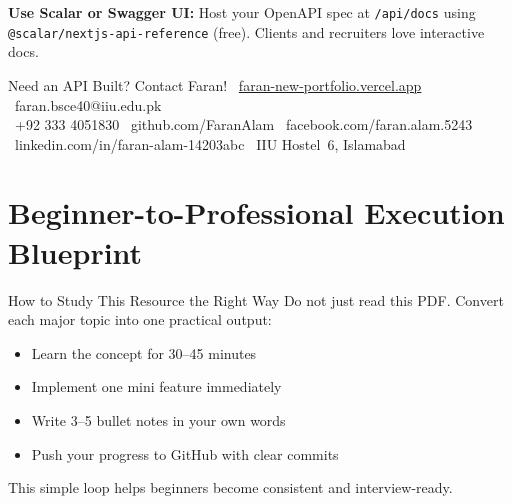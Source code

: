 \documentclass[12pt,a4paper]{article}
\begin{document}
\begin{tipbox}
\textbf{Use Scalar or Swagger UI:} Host your OpenAPI spec at \texttt{/api/docs} using \texttt{@scalar/nextjs-api-reference} (free). Clients and recruiters love interactive docs.
\end{tipbox}

\vspace{0.5cm}
\begin{infobox}{Need an API Built? Contact Faran!}
\faGlobe\ \href{https://faran-new-portfolio.vercel.app/}{faran-new-portfolio.vercel.app} \quad \faEnvelope\ faran.bsce40@iiu.edu.pk\\[0.1cm]
\faWhatsapp\ +92 333 4051830 \quad \faGithub\ github.com/FaranAlam \quad \faFacebook\ facebook.com/faran.alam.5243\\[0.1cm]
\faLinkedin\ linkedin.com/in/faran-alam-14203abc \quad \faMapMarkerAlt\ IIU Hostel~6, Islamabad
\end{infobox}


\section{Beginner-to-Professional Execution Blueprint}

\begin{infobox}{How to Study This Resource the Right Way}
Do not just read this PDF. Convert each major topic into one practical output:
\begin{itemize}[leftmargin=1.5em, itemsep=4pt]
    \item[\ding{52}] Learn the concept for 30--45 minutes
    \item[\ding{52}] Implement one mini feature immediately
    \item[\ding{52}] Write 3--5 bullet notes in your own words
    \item[\ding{52}] Push your progress to GitHub with clear commits
\end{itemize}
This simple loop helps beginners become consistent and interview-ready.
\end{infobox}
\end{document}
